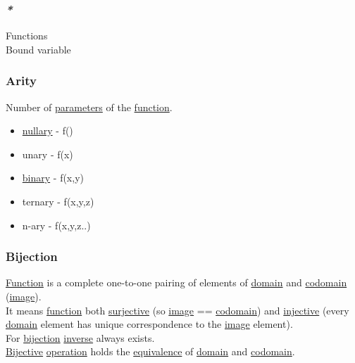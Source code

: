 \documentclass[11pt]{article}
\begin{document}
\subsubsection{\emph{*}}
\label{sec:orgc0a7c4d}

\label{org66c5288}Functions\\
\label{orgb0a8362}Bound variable\\

\subsubsection{\label{orgcb1a08f}Arity}
\label{sec:orgdaa5bf9}
Number of \hyperref[orgbeb3b81]{parameters} of the \hyperref[orgeb5cddb]{function}.\\
\begin{itemize}
\item \hyperref[org0fa472a]{nullary} - f()\\
\item unary   - f(x)\\
\item \hyperref[orgee106ab]{binary}  - f(x,y)\\
\item ternary - f(x,y,z)\\
\item n-ary   - f(x,y,z..)\\
\end{itemize}

\subsubsection{\label{org5f5d89f}Bijection}
\label{sec:org404b92a}
\hyperref[orgeb5cddb]{Function} is a complete one-to-one pairing of elements of \hyperref[orgf784585]{domain} and \hyperref[orgee70232]{codomain} (\hyperref[orgeb43f0e]{image}).\\
It means \hyperref[orgeb5cddb]{function} both \hyperref[org7992b12]{surjective} (so \hyperref[orgeb43f0e]{image} == \hyperref[orgee70232]{codomain}) and \hyperref[orgbdf10ff]{injective} (every \hyperref[orgf784585]{domain} element has unique correspondence to the \hyperref[orgeb43f0e]{image} element).\\

For \hyperref[org5f5d89f]{bijection} \hyperref[org41275e7]{inverse} always exists.\\

\hyperref[orge215793]{Bijective} \hyperref[org87d485b]{operation} holds the \hyperref[orgad1fc87]{equivalence} of \hyperref[orgf784585]{domain} and \hyperref[orgee70232]{codomain}.\\
\end{document}
